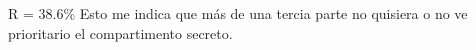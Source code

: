 R = 38.6\%
Esto me indica que más de una tercia parte no quisiera o no ve prioritario el compartimento secreto.
